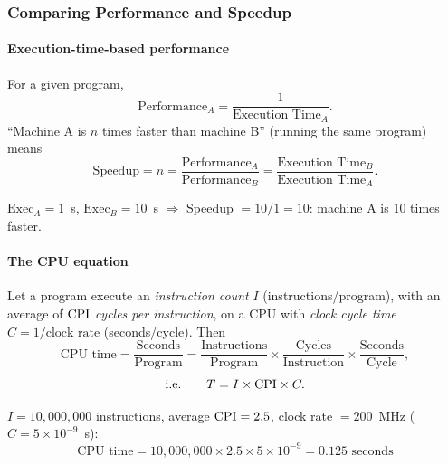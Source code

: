 \subsubsection{Comparing Performance and Speedup}
\label{sec:speedup}

\paragraph{Execution-time-based performance}
\begin{definition}
For a given program,
\[
  \text{Performance}_A = \frac{1}{\text{Execution Time}_A}.
\]
``Machine A is $n$ times faster than machine B'' (running the same program)
means
\[
  \text{Speedup} = n = \frac{\text{Performance}_A}{\text{Performance}_B} =
  \frac{\text{Execution Time}_B}{\text{Execution Time}_A}.
\]
\end{definition}
\begin{eg}
$\text{Exec}_A = 1$~s, $\text{Exec}_B = 10$~s $\Rightarrow$ Speedup $= 10/1 =
10$: machine A is 10 times faster.
\end{eg}

\paragraph{The CPU equation}
\begin{theorem}
Let a program execute an \emph{instruction count} $I$ (instructions/program),
with an average of $\mathrm{CPI}$ \emph{cycles per instruction}, on a CPU with
\emph{clock cycle time} $C = 1/\text{clock rate}$ (seconds/cycle). Then
\[
  \text{CPU time} = \frac{\text{Seconds}}{\text{Program}} =
  \frac{\text{Instructions}}{\text{Program}} \times
  \frac{\text{Cycles}}{\text{Instruction}} \times
  \frac{\text{Seconds}}{\text{Cycle}},
\]
\[
  \text{i.e.}\qquad T = I \times \mathrm{CPI} \times C .
\]
\end{theorem}

\begin{eg}
$I = 10{,}000{,}000$ instructions, average $\mathrm{CPI} =2.5$, clock rate
$=200$~MHz ($C = 5\times10^{-9}$~s):
\[
  \text{CPU time} = 10{,}000{,}000 \times 2.5 \times 5\times10^{-9} = 0.125
  \text{ seconds}
\]
\end{eg}

